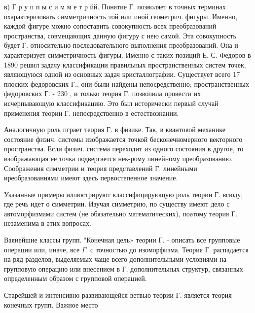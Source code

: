 \documentclass[10pt]{article}
\begin{document}
в) Г р у п п ы с и м м е т р йй. Понятие $Г$. позволяет в точных терминах охарактеризовать симметричность той или иной геометрич. фигуры. Именно, каждой фигуре можно сопоставить совокупность всех преобразований пространства, совмещающих данную фигуру с нею самой. Эта совокупность будет Г. относительно последовательного выполнения преобразований. Она и характеризует симметричность фигуры. Именно с таких позиций Е. С. Федоров в 1890 решил задачу классификации правильных пространственных систем точек, являющуюся одной из основных задач кристаллографии. Существует всего 17 плоских федоровских Г., они были найдены непосредственно; пространственных федоровских Г. - 230 , и только теория Г. позволила провести их исчерпывающую классификацию. Это был исторически первый случай применения теории Г. непосредственно в естествознании.



Аналогичную роль пграет теория Г. в физике. Так, в квантовой механике состояние физич. системы изображается точкой бесконечномерного векторного пространства. Если физич. система переходит из одного состояния в другое, то изображающая ее точка подвергается нек-рому линейному преобразованию. Соображения симметрии и теория представлений $Г$. линейными иреобразованиями имеют здесь первостепенное значение.



Указанные примеры иллюстрируют классифицирующую роль теории Г. всюду, где речь идет о симметрии. Изучая симметрию, по существу имеют дело с автоморфизмами систем (не обязательно математических), поәтому теория Г. незаменима в әтих вопросах.



Ваянейшие классы групп. "Конечная цель» теории Г. - описать все групповые операции или, иначе, все $\Gamma$. с точностью до изоморфизма. Теория $Г$. распадается на ряд разделов, выделяемых чаще всего дополнительными условиями на групповую операцию или внесением в $Г$. дополнительных структур, связанных определенным образом с групповой операцией.



Старейшей и интенсивно развивающейся ветвью теории Г. является теория конечных групп. Важное место
\end{document}
